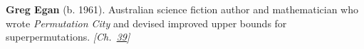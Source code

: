 \textbf{Greg Egan} (b. 1961). Australian science fiction author and mathematician who wrote \emph{Permutation City} and devised improved upper bounds for superpermutations. \emph{[Ch.~\hyperref[ch:superpermutationsbreakthrough]{39}]}

